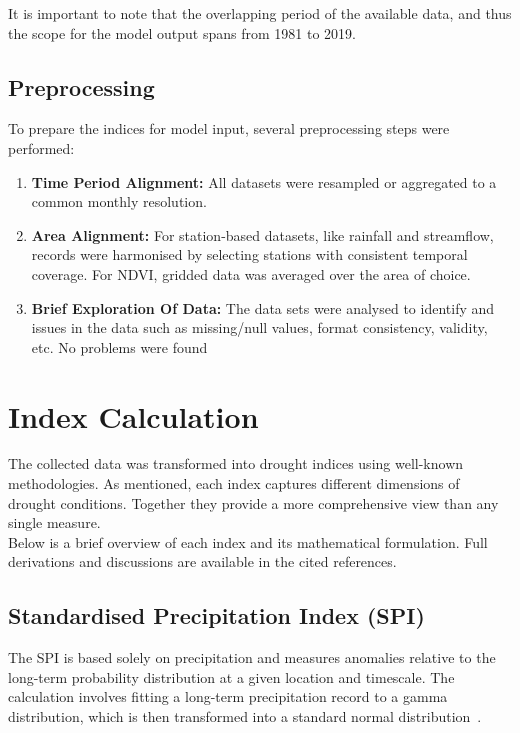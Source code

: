 It is important to note that the overlapping period of the available data, and thus the scope for the model output spans from 1981 to 2019.

\subsection{Preprocessing}


To prepare the indices for model input, several preprocessing steps were performed:  
\begin{enumerate}
    \item \textbf{Time Period Alignment:} All datasets were resampled or aggregated to a common monthly resolution.  
    \item \textbf{Area Alignment:} For station-based datasets, like rainfall and streamflow, records were harmonised by selecting stations with consistent temporal coverage. For NDVI, gridded data was averaged over the area of choice. 
    \item \textbf{Brief Exploration Of Data:} The data sets were analysed to identify and issues in the data such as missing/null values, format consistency, validity, etc. No problems were found
\end{enumerate}


\section{Index Calculation}
\label{sec:index-calc}
The collected data was transformed into drought indices using well-known methodologies. As mentioned, each index captures different dimensions of drought conditions. Together they provide a more comprehensive view than any single measure. \\
Below is a brief overview of each index and its mathematical formulation. Full derivations and discussions are available in the cited references.

\subsection{Standardised Precipitation Index (SPI)}

The SPI is based solely on precipitation and measures anomalies relative to the long-term probability distribution at a given location and timescale. The calculation involves fitting a long-term precipitation record to a gamma distribution, which is then transformed into a standard normal distribution~\cite{spi_seminal_paper}.

